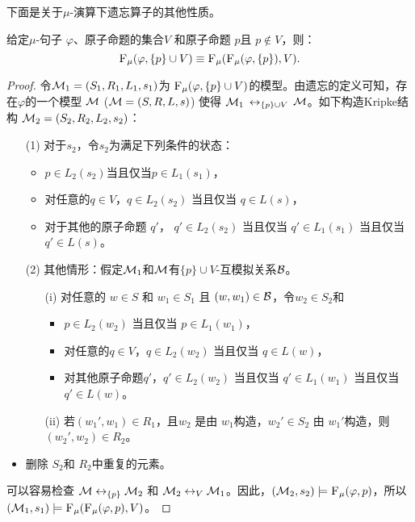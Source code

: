 


下面是关于$\mu$-演算下遗忘算子的其他性质。


\begin{proposition}[模块性]\label{chapter06:disTF}  给定$\mu$-句子 $\varphi$、原子命题的集合$V$ 和原子命题 $p$且 $p \notin V$，则：
	\[
	{\textsc{F}_{\textsc{$\mu$}}}(\varphi, \{p\} \cup V) \equiv {\textsc{F}_{\textsc{$\mu$}}}({\textsc{F}_{\textsc{$\mu$}}}(\varphi, \{p\}), V).
	\]
\end{proposition}
\begin{proof}
	令${\cal M}_1=(S_1, R_1, L_1, s_1)$为 ${\textsc{F}_{\textsc{$\mu$}}}(\varphi, \{p\} \cup V)$的模型。由遗忘的定义可知，存在$\varphi$的一个模型 ${\cal M}$ (${\cal M} = (S, R,L, s)$) 使得 ${\cal M}_1$ $\leftrightarrow_{\{p\} \cup V}$ ${\cal M}$。如下构造Kripke结构 ${\cal M}_2 = (S_2, R_2, L_2, s_2)$：
	\begin{itemize}
		\item[(1)] 对于$s_2$，令$s_2$为满足下列条件的状态：
		\begin{itemize}
			\item $p \in L_2(s_2)$当且仅当$p \in L_1(s_1)$，
			\item 对任意的$q \in V$，$q \in L_2(s_2)$ 当且仅当 $q\in L(s)$，
			\item 对于其他的原子命题 $q'$， $q' \in L_2(s_2)$ 当且仅当 $q' \in L_1(s_1)$ 当且仅当 $q'\in L(s)$。
		\end{itemize}
		\item[(2)] 其他情形：假定${\cal M}_1$和${\cal M}$有$\{p\} \cup V$-互模拟关系${\cal B}$。
		\begin{itemize}
			\item[(i)] 对任意的 $w \in S$ 和 $w_1 \in S_1$ 且 $(w,w_1)\in {\cal B}$，令$w_2 \in S_2$和
			\begin{itemize}
				\item $p \in L_2(w_2)$ 当且仅当 $p \in L_1(w_1)$，
				\item 对任意的$q \in V$，$q \in L_2(w_2)$ 当且仅当 $q\in L(w)$，
				\item 对其他原子命题$q'$，$q' \in L_2(w_2)$ 当且仅当 $q' \in L_1(w_1)$ 当且仅当 $q'\in L(w)$。
			\end{itemize}
			\item[(ii)] 若$(w_1', w_1)\in R_1$，且$w_2$ 是由 $w_1$构造，$w_2'\in S_2$ 由 $w_1'$构造，则$(w_2', w_2)\in R_2$。
		\end{itemize}
		\item 删除 $S_2$和 $R_2$中重复的元素。
	\end{itemize}
	可以容易检查 ${\cal M} \leftrightarrow_{\{p\}} {\cal M}_2$ 和 ${\cal M}_2 \leftrightarrow_V {\cal M}_1$。因此，$({\cal M}_2, s_2) \models {\textsc{F}_{\textsc{$\mu$}}}(\varphi, p)$，所以 $({\cal M}_1, s_1) \models {\textsc{F}_{\textsc{$\mu$}}}({\textsc{F}_{\textsc{$\mu$}}}(\varphi, p), V)$。
	

\end{proof}
